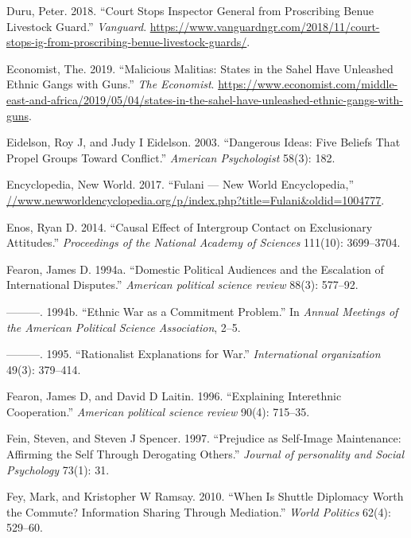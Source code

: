 \documentclass[11pt]{article}
\begin{document}
\leavevmode\hypertarget{ref-duru2018court}{}%
Duru, Peter. 2018. ``Court Stops Inspector General from Proscribing
Benue Livestock Guard.'' \emph{Vanguard}.
\url{https://www.vanguardngr.com/2018/11/court-stops-ig-from-proscribing-benue-livestock-guards/}.

\leavevmode\hypertarget{ref-economist2019militias}{}%
Economist, The. 2019. ``Malicious Malitias: States in the Sahel Have
Unleashed Ethnic Gangs with Guns.'' \emph{The Economist}.
\url{https://www.economist.com/middle-east-and-africa/2019/05/04/states-in-the-sahel-have-unleashed-ethnic-gangs-with-guns}.

\leavevmode\hypertarget{ref-eidelson2003dangerous}{}%
Eidelson, Roy J, and Judy I Eidelson. 2003. ``Dangerous Ideas: Five
Beliefs That Propel Groups Toward Conflict.'' \emph{American
Psychologist} 58(3): 182.

\leavevmode\hypertarget{ref-fulanisize2017}{}%
Encyclopedia, New World. 2017. ``Fulani --- New World Encyclopedia,''
\url{//www.newworldencyclopedia.org/p/index.php?title=Fulani\&oldid=1004777}.

\leavevmode\hypertarget{ref-enos2014causal}{}%
Enos, Ryan D. 2014. ``Causal Effect of Intergroup Contact on
Exclusionary Attitudes.'' \emph{Proceedings of the National Academy of
Sciences} 111(10): 3699--3704.

\leavevmode\hypertarget{ref-fearon1994domestic}{}%
Fearon, James D. 1994a. ``Domestic Political Audiences and the
Escalation of International Disputes.'' \emph{American political science
review} 88(3): 577--92.

\leavevmode\hypertarget{ref-fearon1994ethnic}{}%
---------. 1994b. ``Ethnic War as a Commitment Problem.'' In
\emph{Annual Meetings of the American Political Science Association},
2--5.

\leavevmode\hypertarget{ref-fearon1995rationalist}{}%
---------. 1995. ``Rationalist Explanations for War.''
\emph{International organization} 49(3): 379--414.

\leavevmode\hypertarget{ref-fearon1996explaining}{}%
Fearon, James D, and David D Laitin. 1996. ``Explaining Interethnic
Cooperation.'' \emph{American political science review} 90(4): 715--35.

\leavevmode\hypertarget{ref-fein1997prejudice}{}%
Fein, Steven, and Steven J Spencer. 1997. ``Prejudice as Self-Image
Maintenance: Affirming the Self Through Derogating Others.''
\emph{Journal of personality and Social Psychology} 73(1): 31.

\leavevmode\hypertarget{ref-fey2010shuttle}{}%
Fey, Mark, and Kristopher W Ramsay. 2010. ``When Is Shuttle Diplomacy
Worth the Commute? Information Sharing Through Mediation.'' \emph{World
Politics} 62(4): 529--60.
\end{document}
